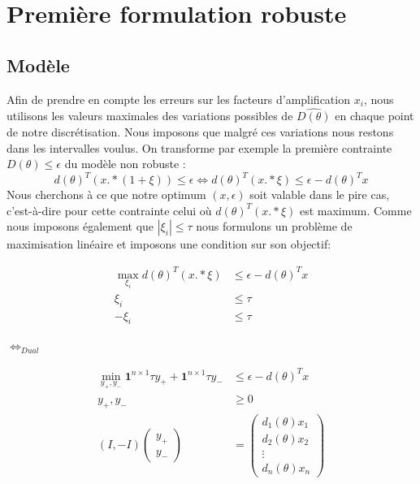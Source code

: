 \section{Première formulation robuste}
\subsection{Modèle}

Afin de prendre en compte les erreurs sur les facteurs d'amplification $x_i$, nous utilisons les valeurs maximales des variations possibles de $\hat{D(\theta)}$ en chaque point de notre discrétisation. Nous imposons que malgré ces variations nous restons dans les intervalles voulus. On transforme par exemple la première contrainte $D(\theta)\leq \epsilon$ du modèle non robuste :
\begin{equation}
d(\theta)^T (x.*(1+\xi)) \leq \epsilon \Longleftrightarrow d(\theta)^T (x.*\xi) \leq \epsilon- d(\theta)^T x
\end{equation}
Nous cherchons à ce que notre optimum $(x,\epsilon)$ soit valable dans le pire cas, c'est-à-dire pour cette contrainte celui où $d(\theta)^T (x.*\xi)$ est maximum. Comme nous imposons également que $|\xi_i|\leq \tau$ nous formulons un problème de maximisation linéaire et imposons une condition sur son objectif: 
\begin{center}
\begin{minipage}{0.4\textwidth}
\begin{align*}
\max_{\xi_i} d(\theta)^T (x.*\xi)  & \leq \epsilon- d(\theta)^T x \\
\xi_i & \leq \tau \\
-\xi_i & \leq \tau 
\end{align*} 
\end{minipage}
$\Leftrightarrow _{Dual}$
\begin{minipage}{0.4\textwidth}
\begin{align*}
\min_{y_+,y_-} \mathbf{1}^{n\times 1}\tau y_++\mathbf{1}^{n\times 1}\tau y_- & \leq \epsilon- d(\theta)^T x \\
y_+,y_-  & \geq  0 \\
(I,-I)\begin{pmatrix}
y_+ \\
y_-
\end{pmatrix}
& = 
\begin{pmatrix}
d_1(\theta)x_1 \\
d_2(\theta)x_2 \\
\vdots \\
d_n(\theta)x_n 
\end{pmatrix}
\end{align*}
\end{minipage}
\end{center}

